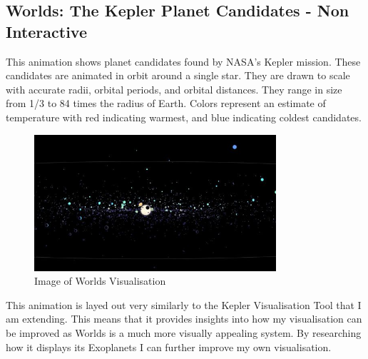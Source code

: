 \subsection{Worlds: The Kepler Planet Candidates - Non Interactive}
 This animation \cite{worlds} shows  planet candidates found by NASA's Kepler mission. These candidates are animated in orbit around a single star. They are drawn to scale with accurate radii, orbital periods, and orbital distances. They range in size from 1/3 to 84 times the radius of Earth. Colors represent an estimate of temperature with red indicating warmest, and blue indicating coldest candidates. 
\begin{figure}[h!]
  \centering
      \includegraphics[width=0.8\textwidth]{images/worlds.jpg}
  \caption{Image of Worlds Visualisation}
\end{figure}
This animation is layed out very similarly to the Kepler Visualisation Tool that I am extending. This means that it provides insights into how my visualisation can be improved as Worlds is a much more visually appealing system. By researching how it displays its Exoplanets I can further improve my own visualisation.

